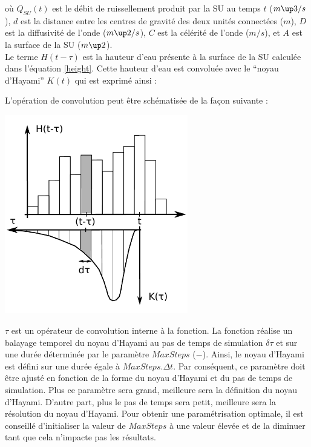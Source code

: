 

où $Q_{SU}(t)$ est le débit de ruissellement produit par la SU au temps $t$ ($m\up3/s$), $d$ est la distance entre les centres de gravité des deux unités connectées ($m$), $D$ est la diffusivité de l'onde ($m\up2/s$), $C$ est la célérité de l'onde ($m/s$), et $A$ est la surface de la SU ($m\up2$).\\

Le terme $H(t-\tau)$ est la hauteur d'eau présente à la surface de la SU calculée dans l'équation \ref{height}. Cette hauteur d'eau est convoluée avec le ``noyau d'Hayami'' $K(t)$ qui est exprimé ainsi :



L'opération de convolution peut être schématisée de la façon suivante :

\includegraphics[width=8cm]{doc/common/Convolution_HayamiSU.pdf}

$\tau$ est un opérateur de convolution interne à la fonction. La fonction réalise un balayage temporel du noyau d'Hayami au pas de temps de simulation $\delta \tau$ et sur une durée déterminée par le paramètre $MaxSteps$ ($-$). Ainsi, le noyau d'Hayami est défini sur une durée égale à $MaxSteps.\Delta t$. Par conséquent, ce paramètre doit être ajusté en fonction de la forme du noyau d'Hayami et du pas de temps de simulation. Plus ce paramètre sera grand, meilleure sera la définition du noyau d'Hayami. D'autre part, plus le pas de temps sera petit, meilleure sera la résolution du noyau d'Hayami. Pour obtenir une paramétrisation optimale, il est conseillé d'initialiser la valeur de $MaxSteps$ à une valeur élevée et de la diminuer tant que cela n'impacte pas les résultats.\\


